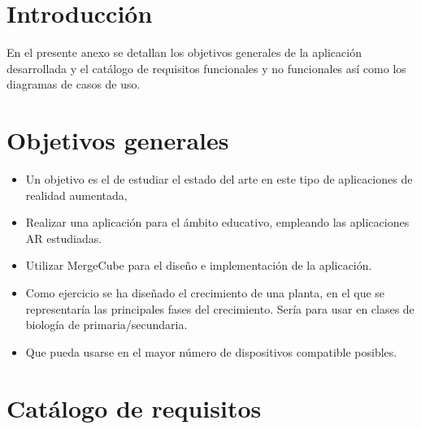 
\section{Introducción}
En el presente anexo se detallan los objetivos generales de la aplicación desarrollada y el catálogo de requisitos funcionales y no funcionales así como los diagramas de casos de uso.
\section{Objetivos generales}
\begin{itemize}
	\item Un objetivo es el de estudiar el estado del arte en este tipo de aplicaciones de realidad aumentada, 
	\item Realizar una aplicación para el ámbito educativo, empleando las aplicaciones AR estudiadas.
	\item Utilizar MergeCube para el diseño e implementación de la aplicación.
	\item Como ejercicio se ha diseñado el crecimiento de una planta, en el que se representaría las principales fases del crecimiento. Sería para usar en clases de biología de primaria/secundaria.
	\item Que pueda usarse en el mayor número de dispositivos compatible posibles.
\end{itemize}
\section{Catálogo de requisitos}
